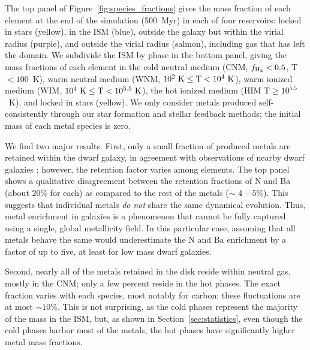 \documentclass[twocolumn]{aastex61}
\begin{document}
The top panel of Figure~\ref{fig:species_fractions} gives the mass fraction of each element at the end of the simulation (500~Myr) in each of four reservoirs: locked in stars (yellow), in the ISM (blue), outside the galaxy but within the virial radius (purple), and outside the virial radius (salmon), including gas that has left the domain. We subdivide the ISM by phase in the bottom panel, giving the mass fractions of each element in the cold neutral medium (CNM, $f_{\rm H_2} < 0.5$,  T$< 100$~K), warm neutral medium (WNM, $10^2~\rm{K}\le \rm{T} < 10^4~\rm{K}$), warm ionized medium (WIM, $10^4~\rm{K}\le \rm{T} < 10^{5.5}~\rm{K}$), the hot ionized medium (HIM T$\ge 10^{5.5}$~K), and locked in stars (yellow). 
    We
only consider metals produced self-consistently through our star formation and stellar feedback methods; the initial mass of each metal species is zero.

We find two major results.
    First, 
only a small fraction of produced metals are retained within the dwarf galaxy, in agreement with observations of nearby dwarf galaxies \citep[see][]{Kirby2011-metals, McQuinn2015}; however, the retention factor varies 
    among elements. The top panel shows a qualitative disagreement between the retention fractions of N and Ba (about 20\% for each) as compared to the rest of the metals ($\sim$ 4 -- 5\%). This suggests that individual metals \textit{do not} share the same dynamical evolution. 
       Thus, 
metal enrichment in galaxies is a phenomenon that cannot be fully captured using a single, global metallicity field. In this particular case, assuming that all metals behave the same would underestimate the N and Ba enrichment by a factor of up to five, at least for low mass dwarf galaxies.

    Second,
nearly all of the metals 
    retained in the disk
reside within neutral gas, mostly in the CNM; only a few percent
reside in the hot phases. The exact fraction varies with each species, most notably for carbon; these fluctuations are at most $\sim 10$\%. This is not surprising, as the cold phases represent the majority of the mass in the ISM, but, as shown in Section~\ref{sec:statistics}, even though the cold phases harbor most of the metals, the hot phases have significantly higher metal mass fractions. 
\end{document}
